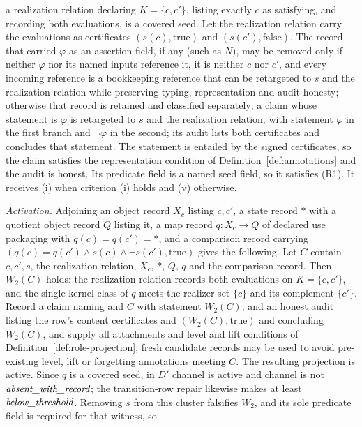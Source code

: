 \begin{remark}
a realization relation declaring \(K=\{c,c'\}\), listing exactly \(c\) as
satisfying, and recording both evaluations, is a covered \Ptwo{} seed. Let the
realization relation carry the evaluations as certificates
\((s(c),\mathrm{true})\) and \((s(c'),\mathrm{false})\). The record that carried \(\varphi\) as an assertion field, if any (such as
\(N\)), may be removed only if neither \(\varphi\) nor its named inputs
reference it, it is neither \(c\) nor \(c'\), and every incoming reference is a
bookkeeping reference that can be retargeted to \(s\) and the realization
relation while preserving typing, representation and audit honesty; otherwise
that record is retained and classified separately; a claim whose statement
is \(\varphi\) is retargeted to \(s\) and the realization relation, with statement
\(\varphi\) in the first branch and \(\neg\varphi\) in the second; its audit lists
both certificates and concludes that statement. The statement is entailed by
the signed certificates, so the claim satisfies the representation condition
of Definition~\ref{def:annotations} and the audit is honest. Its
predicate field is a named seed field, so it satisfies (R1). It receives (i)
when criterion (i) holds and (v) otherwise. \par\emph{Activation.} Adjoining an object record \(X_c\)
listing \(c,c'\), a state record \(*\) with a quotient object record \(Q\)
listing it, a map record \(q:X_c\to Q\) of declared use packaging with
\(q(c)=q(c')=*\), and a comparison record carrying
\((q(c)=q(c')\wedge s(c)\wedge\neg s(c'),\mathrm{true})\) gives the following. Let \(C\) contain \(c,c',s\), the realization
relation, \(X_c\), \(*\), \(Q\), \(q\) and the comparison record. Then
\(W_2(C)\) holds: the realization relation records both evaluations on
\(K=\{c,c'\}\), and the single kernel class of \(q\) meets the realizer set
\(\{c\}\) and its complement \(\{c'\}\). Record a claim naming \Ptwo{} and \(C\)
with statement \(W_2(C)\), and an honest audit listing the row's content
certificates and \((W_2(C),\mathrm{true})\) and concluding \(W_2(C)\), and
supply all attachments and level and lift conditions of
Definition~\ref{def:role-projection}; fresh candidate records may be used to
avoid pre-existing level, lift or forgetting annotations meeting \(C\). The
resulting projection is active. Since \(q\) is a covered \Pfive{} seed, in \(D'\) channel \Ptwo{} is active and channel \Pfive{} is not \(\textit{absent\_\allowbreak with\_\allowbreak record}\); the transition-row repair likewise makes \Pfour{} at least \(\textit{below\_\allowbreak threshold}\). Removing \(s\) from this cluster falsifies
\(W_2\), and its sole predicate field is required for that witness, so

\end{remark}

